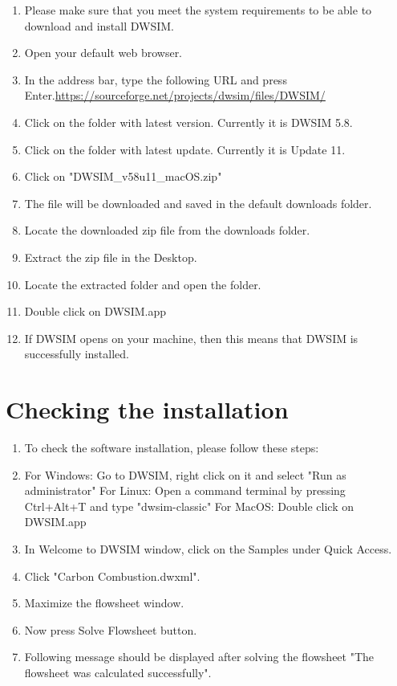\documentclass[12pt,a4paper]{article}
\begin{document}
\begin{enumerate}
\item Please make sure that you meet the system requirements to be able to download and install DWSIM.
\item Open your default web browser.
\item In the address bar, type the following URL and press Enter.\newline \url{https://sourceforge.net/projects/dwsim/files/DWSIM/}

\item Click on the folder with latest version. Currently it is DWSIM 5.8.

\item Click on the folder with latest update. Currently it is Update 11.
\item Click on "DWSIM\_v58u11\_macOS.zip"
\item The file will be downloaded and saved in the default downloads folder.
\item Locate the downloaded zip file from the downloads folder.
\item Extract the zip file in the Desktop.
\item Locate the extracted folder and open the folder.
\item Double click on DWSIM.app
\item If DWSIM opens on your machine, then this means that DWSIM is successfully installed.

\end{enumerate}

\section{Checking the installation}

\begin{enumerate}

\item To check the software installation, please follow these steps:
\item For Windows: Go to DWSIM, right click on it and select "Run as administrator"
\newline For Linux: Open a command terminal by pressing Ctrl+Alt+T and type "dwsim-classic"
\newline For MacOS: Double click on DWSIM.app
\item In Welcome to DWSIM window, click on the Samples under Quick Access.
\item Click "Carbon Combustion.dwxml".
\item Maximize the flowsheet window.
\item Now press Solve Flowsheet button.
\item Following message should be displayed after solving the flowsheet "The flowsheet was calculated successfully".

\end{enumerate}
\end{document}
